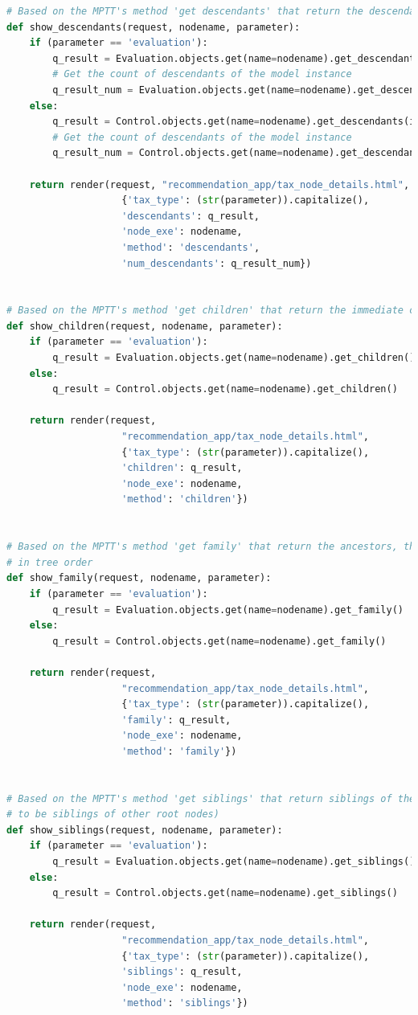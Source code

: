 \begin{lstlisting}[language=Python, caption={Parti principali del codice delle View della soluzione per gestire la navigazione 
	delle tassonomie, quella delle Evaluation e quella dei Controlli}]
# Based on the MPTT's method 'get descendants' that return the descendants of a model instance, in tree order
def show_descendants(request, nodename, parameter):
	if (parameter == 'evaluation'):
		q_result = Evaluation.objects.get(name=nodename).get_descendants(include_self=False)
		# Get the count of descendants of the model instance
		q_result_num = Evaluation.objects.get(name=nodename).get_descendant_count()
	else:
		q_result = Control.objects.get(name=nodename).get_descendants(include_self=False)
		# Get the count of descendants of the model instance
		q_result_num = Control.objects.get(name=nodename).get_descendant_count()

	return render(request, "recommendation_app/tax_node_details.html",
					{'tax_type': (str(parameter)).capitalize(),
					'descendants': q_result,
					'node_exe': nodename,
					'method': 'descendants',
					'num_descendants': q_result_num})


# Based on the MPTT's method 'get children' that return the immediate children of a model instance, in tree order
def show_children(request, nodename, parameter):
	if (parameter == 'evaluation'):
		q_result = Evaluation.objects.get(name=nodename).get_children()
	else:
		q_result = Control.objects.get(name=nodename).get_children()

	return render(request,
					"recommendation_app/tax_node_details.html",
					{'tax_type': (str(parameter)).capitalize(),
					'children': q_result,
					'node_exe': nodename,
					'method': 'children'})


# Based on the MPTT's method 'get family' that return the ancestors, the model instance itself and the descendants,
# in tree order
def show_family(request, nodename, parameter):
	if (parameter == 'evaluation'):
		q_result = Evaluation.objects.get(name=nodename).get_family()
	else:
		q_result = Control.objects.get(name=nodename).get_family()

	return render(request,
					"recommendation_app/tax_node_details.html",
					{'tax_type': (str(parameter)).capitalize(),
					'family': q_result,
					'node_exe': nodename,
					'method': 'family'})


# Based on the MPTT's method 'get siblings' that return siblings of the model instance (root nodes are considered
# to be siblings of other root nodes)
def show_siblings(request, nodename, parameter):
	if (parameter == 'evaluation'):
		q_result = Evaluation.objects.get(name=nodename).get_siblings()
	else:
		q_result = Control.objects.get(name=nodename).get_siblings()

	return render(request,
					"recommendation_app/tax_node_details.html",
					{'tax_type': (str(parameter)).capitalize(),
					'siblings': q_result,
					'node_exe': nodename,
					'method': 'siblings'})	
\end{lstlisting}






